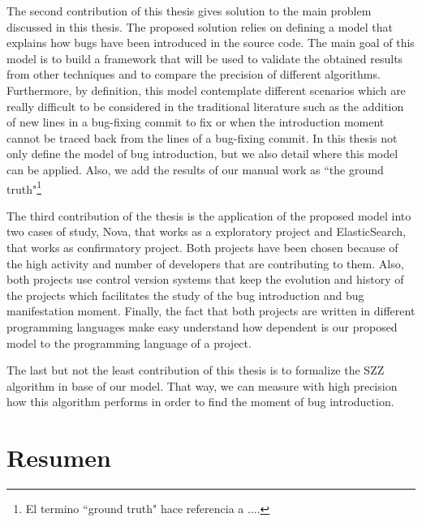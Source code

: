 \documentclass[a4paper, 12pt]{book}
\begin{document}
  The second contribution of this thesis gives solution to the main problem discussed in this thesis. The proposed solution relies on defining a model that explains how bugs have been introduced in the source code. The main goal of this model is to build a framework that will be used to validate the obtained results from other techniques and to compare the precision of different algorithms. Furthermore, by definition, this model contemplate different scenarios which are really difficult to be considered in the traditional literature such as the addition of new lines in a bug-fixing commit to fix or when the introduction moment cannot be traced back from the lines of a bug-fixing commit. In this thesis not only define the model of bug introduction, but we also detail where this model can be applied. Also, we add the results of our manual work as ``the ground truth"\footnote{El termino ``ground truth" hace referencia a ....}

The third contribution of the thesis is the application of the proposed model into two cases of study, Nova, that works as a exploratory project and ElasticSearch, that works as confirmatory project. Both projects have been chosen because of the high activity and number of developers that are contributing to them. Also, both projects use control version systems that keep the evolution and history of the projects which facilitates the study of the bug introduction and bug manifestation moment. Finally, the fact that both projects are written in different programming languages make easy understand how dependent is our proposed model to the programming language of a project.

The last but not the least contribution of this thesis is to formalize the SZZ algorithm in base of our model. That way, we can measure with high precision how this algorithm performs in order to find the moment of bug introduction.

\chapter*{Resumen}
\end{document}
